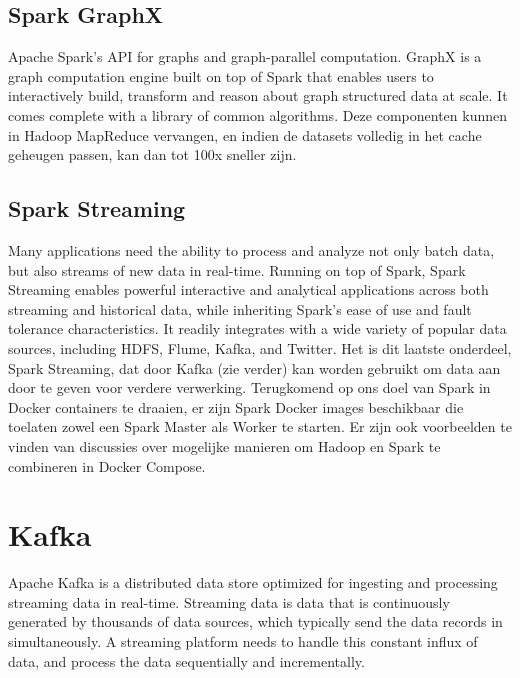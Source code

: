 \subsection{Spark GraphX}
Apache Spark's API for graphs and graph-parallel computation.
GraphX is a graph computation engine built on top of Spark that enables users to interactively build, transform and reason about graph structured data at scale. It comes complete with a library of common algorithms.\autocite{databricks2023}
\newline
\newline
Deze componenten kunnen in Hadoop MapReduce vervangen, en indien de datasets volledig in het cache geheugen passen, kan dan tot 100x sneller zijn.


\subsection{Spark Streaming}
Many applications need the ability to process and analyze not only batch data, but also streams of new data in real-time. Running on top of Spark, Spark Streaming enables powerful interactive and analytical applications across both streaming and historical data, while inheriting Spark’s ease of use and fault tolerance characteristics. It readily integrates with a wide variety of popular data sources, including HDFS, Flume, Kafka, and Twitter.\autocite{databricks2023}
\newline
\newline
Het is dit laatste onderdeel, Spark Streaming, dat door Kafka (zie verder) kan worden gebruikt om data aan door te geven voor verdere verwerking.
\newline
\newline
Terugkomend op ons doel van Spark in Docker containers te draaien, er zijn Spark Docker images beschikbaar die toelaten zowel een Spark Master als Worker te starten.
\newline
\newline
Er zijn ook voorbeelden te vinden van discussies over mogelijke manieren om Hadoop en Spark te combineren in Docker Compose.


\section{Kafka}
Apache Kafka is a distributed data store optimized for ingesting and processing streaming data in real-time. Streaming data is data that is continuously generated by thousands of data sources, which typically send the data records in simultaneously. A streaming platform needs to handle this constant influx of data, and process the data sequentially and incrementally.
\autocite{AwsAmazon2023b}


